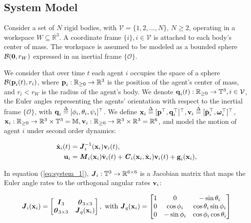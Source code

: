 \subsection{System Model}

Consider a set of $N$ rigid bodies, with $\mathcal{V} = \{ 1,2, \ldots, N\}$,
$N  \geq 2$, operating in a workspace $W\subseteq \mathbb{R}^3$.
A coordinate frame $\{i\}, i\in\mathcal{V}$ is attached to each body's
center of mass. The workspace is assumed to be modeled as a
bounded sphere $\mathcal{B}(\bm{\mathbf{0}},r_W)$ expressed in an inertial frame
$\{\mathcal{O}\}$.

We consider that over time $t$ each agent $i$ occupies the space of a sphere
$\mathcal{B}(\bm{\mathbf{p}}_i(t), r_i)$, where $\bm{\mathbf{p}}_i : \mathbb{R}_{\geq 0} \to \mathbb{R}^3$
is the position of the agent's center of mass, and $r_i < r_W$ is the radius of the
agent's body. We denote $\bm{\mathbf{q}}_i(t):\mathbb{R}_{\geq 0} \to \mathbb{T}^3, i\in\mathcal{V}$,
the Euler angles representing the agents' orientation with respect to the
inertial frame $\{\mathcal{O}\}$,
with $\bm{\mathbf{q}}_i \overset{\Delta}{=} [\phi_i,\theta_i,\psi_i]^{\top}$.
We define $\bm{\mathbf{x}}_i \overset{\Delta}{=} [\bm{\mathbf{p}}^{\top},\bm{\mathbf{q}}^{\top}_i]^{\top},
\bm{\mathbf{v}}_i \overset{\Delta}{=} [\dot{\bm{\mathbf{p}}}^{\top}_i, \bm{\mathbf{\omega}}^{\top}_i]^{\top}$,
$\bm{\mathbf{x}}_i:\mathbb{R}_{\geq 0} \to \mathbb{R}^3\times \mathbb{T}^3 =
\mathbb{M}, \bm{\mathbf{v}}_i : \mathbb{R}_{\geq 0} \to \mathbb{R}^3\times \mathbb{R}^3
= \mathbb{R}^6$, and model the motion of agent $i$ under second order dynamics:

\begin{subequations}
	\begin{align}
    \dot{\bm{\mathbf{x}}}_i(t) &= \bm{\mathit{J}}_i^{-1}(\bm{\mathbf{x}}_i) \bm{\mathbf{v}}_i(t), \label{eq:system_1} \\
    \bm{\mathbf{u}}_i &= \bm{\mathit{M}}_i(\bm{\mathbf{x}}_i) \dot{\bm{\mathbf{v}}}_i(t) + \bm{\mathit{C}}_i(\bm{\mathbf{x}}_i,\dot{\bm{\mathbf{x}}}_i) \bm{\mathbf{v}}_i(t)+\bm{\mathbf{g}}_i(\bm{\mathbf{x}}_i), \label{eq:system_2}
	\end{align}
  \label{eq:system}
\end{subequations}

In equation (\ref{eq:system_1}), $\bm{\mathit{J}}_i:\mathbb{T}^3 \to \mathbb{R}^{6\times6}$ is
a Jacobian matrix that maps the Euler angle rates to the orthogonal angular
rates $\bm{\mathbf{v}}_i$:

\begin{equation}
  \bm{\mathit{J}}_i(\bm{\mathbf{x}}_i) =
  \begin{bmatrix}
    \bm{\mathit{I}}_3 & \bm{\mathit{0}}_{3 \times 3} \\
    \bm{\mathit{0}}_{3 \times 3} & \bm{\mathit{J}}_{ q }(\bm{\mathbf{x}}_i) \\
  \end{bmatrix} \notag, \text{ with }
  \bm{\mathit{J}}_q(\bm{\mathbf{x}}_i) =
  \begin{bmatrix}
    1 & 0 & -\sin\theta_i \\
    0 & \cos\phi_i & \cos\theta_i \sin\phi_i \\
    0 & - \sin\phi_i & \cos\phi_i \cos\theta_i
  \end{bmatrix} \notag
\end{equation}

